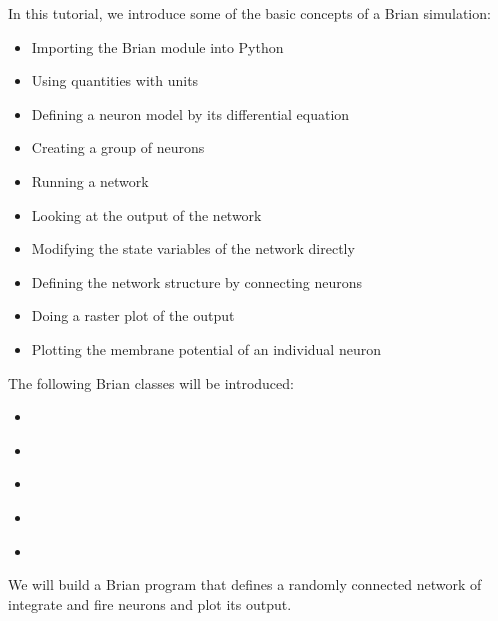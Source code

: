 \documentclass[letterpaper,10pt]{manual}
\begin{document}
In this tutorial, we introduce some of the basic concepts of a Brian simulation:
\begin{itemize}
\item {} 
Importing the Brian module into Python

\item {} 
Using quantities with units

\item {} 
Defining a neuron model by its differential equation

\item {} 
Creating a group of neurons

\item {} 
Running a network

\item {} 
Looking at the output of the network

\item {} 
Modifying the state variables of the network directly

\item {} 
Defining the network structure by connecting neurons

\item {} 
Doing a raster plot of the output

\item {} 
Plotting the membrane potential of an individual neuron

\end{itemize}

The following Brian classes will be introduced:
\begin{itemize}
\item {} 
\hyperlink{brian.Model}{}

\item {} 
\hyperlink{brian.NeuronGroup}{}

\item {} 
\hyperlink{brian.Connection}{}

\item {} 
\hyperlink{brian.SpikeMonitor}{}

\item {} 
\hyperlink{brian.StateMonitor}{}

\end{itemize}

We will build a Brian program that defines a randomly connected network of integrate
and fire neurons and plot its output.
\end{document}
